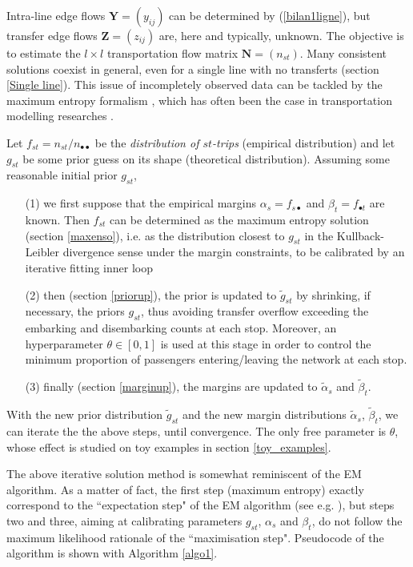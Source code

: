 \documentclass{bmcart}
\begin{document}
Intra-line edge flows $\mathbf{Y}=(y_{ij})$ can be determined by (\ref{bilan1ligne}), but transfer edge flows $\mathbf{Z}=(z_{ij})$ are, here and typically, unknown. The objective is to estimate the $l\times l$ transportation flow matrix $\mathbf{N}=(n_{st})$. Many consistent solutions coexist in general, even for a single line with no transferts (section \ref{Single line}). This issue of incompletely observed data can be tackled by the maximum entropy formalism \cite{jaynes1957information}, which has often been the case in transportation modelling researches \cite{wilson1967statistical}  \cite{erlander1990gravity}. 



Let $f_{st}=n_{st}/n_{\bullet\bullet}$ be the \emph{distribution of $st$-trips} (empirical distribution) and let $g_{st}$ be some prior guess on its shape (theoretical distribution). 
Assuming some reasonable initial prior $g_{st}$, 
\begin{itemize}
\item[(1)] we first suppose that the empirical margins $\alpha_s=f_{s\bullet}$ and $\beta_t=f_{\bullet t}$ are known.  
Then $f_{st}$ can be determined as the maximum entropy solution (section \ref{maxenso}), i.e. as the distribution closest to $g_{st}$ in the Kullback-Leibler divergence sense under the margin constraints, to be calibrated by an iterative fitting inner loop
\item[(2)] then (section \ref{priorup}), the prior is updated to $\tilde{g}_{st}$ by shrinking, if necessary, the priors $g_{st}$, thus avoiding transfer overflow exceeding the embarking and disembarking counts at each stop. Moreover, an hyperparameter $\theta \in [0, 1]$ is used at this stage in order to control the minimum proportion of passengers entering/leaving the network at each stop.
\item[(3)] finally (section \ref{marginup}), the margins are updated to $\tilde{\alpha}_s$ and $\tilde{\beta}_t$.
\end{itemize}
With the new prior distribution $\widetilde{g}_{st}$ and the new margin distributions $\widetilde{\alpha}_s$, $\widetilde{\beta}_t$, we can iterate the 
 the above steps, until convergence. The only free parameter is $\theta$, whose effect is studied on toy examples in section \ref{toy_examples}.
 
The above iterative solution method is somewhat reminiscent of the EM algorithm. As a matter of fact, the first  step  (maximum entropy) exactly correspond to the ``expectation step" of the EM algorithm (see e.g. \cite{dempster1977maximum}  \cite{bavaud2009information}), but steps two and three, aiming at calibrating parameters $g_{st}$, $\alpha_s$ and $\beta_t$, do not follow the maximum likelihood rationale of the ``maximisation step". Pseudocode of the algorithm is shown with Algorithm \ref{algo1}.
\end{document}

